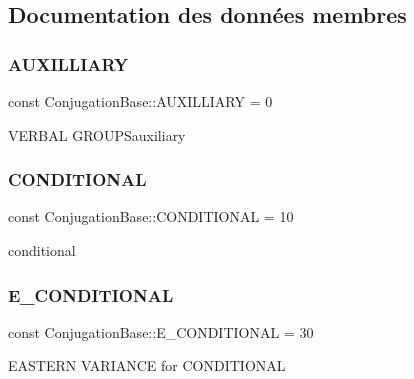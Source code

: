 \subsection{Documentation des données membres}
\hypertarget{class_conjugation_base_a997e57538ff7276bae361d1333f11d11}{}\label{class_conjugation_base_a997e57538ff7276bae361d1333f11d11} 
\subsubsection{\texorpdfstring{A\+U\+X\+I\+L\+L\+I\+A\+RY}{AUXILLIARY}}
{\footnotesize\ttfamily const Conjugation\+Base\+::\+A\+U\+X\+I\+L\+L\+I\+A\+RY = 0}

V\+E\+R\+B\+AL G\+R\+O\+U\+P\+Sauxiliary \hypertarget{class_conjugation_base_aac0359d9a8bb66ea04612b7f14d43c50}{}\label{class_conjugation_base_aac0359d9a8bb66ea04612b7f14d43c50} 
\subsubsection{\texorpdfstring{C\+O\+N\+D\+I\+T\+I\+O\+N\+AL}{CONDITIONAL}}
{\footnotesize\ttfamily const Conjugation\+Base\+::\+C\+O\+N\+D\+I\+T\+I\+O\+N\+AL = 10}

conditional \hypertarget{class_conjugation_base_a9bc888695350391f4d6da8fc191679c4}{}\label{class_conjugation_base_a9bc888695350391f4d6da8fc191679c4} 
\subsubsection{\texorpdfstring{E\+\_\+\+C\+O\+N\+D\+I\+T\+I\+O\+N\+AL}{E\_CONDITIONAL}}
{\footnotesize\ttfamily const Conjugation\+Base\+::\+E\+\_\+\+C\+O\+N\+D\+I\+T\+I\+O\+N\+AL = 30}

E\+A\+S\+T\+E\+RN V\+A\+R\+I\+A\+N\+CE for C\+O\+N\+D\+I\+T\+I\+O\+N\+AL \hypertarget{class_conjugation_base_ab0751622af68b3908a8c1426e42994e3}{}\label{class_conjugation_base_ab0751622af68b3908a8c1426e42994e3} 
